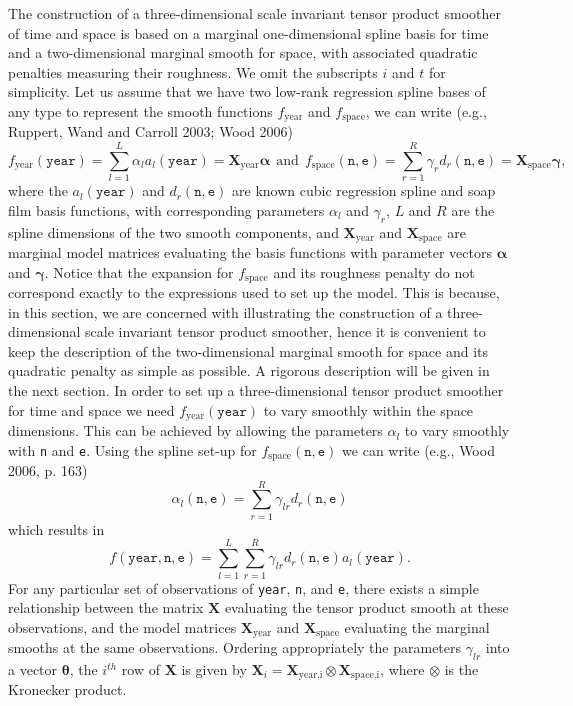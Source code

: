 \documentclass[10pt] {article}
\theoremstyle{definition}
\theoremstyle{plain}
\begin{document}
The construction of a three-dimensional scale invariant tensor product smoother of time and space is based on a marginal one-dimensional spline basis for time and a two-dimensional marginal smooth for space, with associated quadratic penalties measuring their roughness. We omit the subscripts $i$ and $t$ for simplicity. Let us assume that we have two low-rank regression spline bases of any type to represent the smooth functions $f_\text{year}$ and $f_\text{space}$, we can write (e.g., Ruppert, Wand and Carroll 2003; Wood 2006)
$$
f_\text{year}(\texttt{year})=\sum_{l=1}^L \alpha_l a_l(\texttt{year})=\textbf{X}_\text{year}\bm\alpha \ \ \text{and} \ \ f_\text{space}(\texttt{n},\texttt{e})=\sum_{r=1}^R \gamma_r d_r(\texttt{n},\texttt{e})=\textbf{X}_\text{space}\bm\gamma,
$$
where the $a_l(\texttt{year})$ and $d_r(\texttt{n},\texttt{e})$ are known cubic regression spline and soap film basis functions, with corresponding parameters $\alpha_l$ and $\gamma_r$, $L$ and $R$ are the spline dimensions of the two smooth components, and $\textbf{X}_\text{year}$ and $\textbf{X}_\text{space}$ are marginal model matrices evaluating the basis functions with parameter vectors $\bm\alpha$ and $\bm\gamma$. Notice that the expansion for $f_\text{space}$ and its roughness penalty do not correspond exactly to the expressions used to set up the model. This is because, in this section, we are concerned with illustrating the construction of a three-dimensional scale invariant tensor product smoother, hence it is convenient to keep the description of the two-dimensional marginal smooth for space and its quadratic penalty as simple as possible. A rigorous description will be given in the next section. In order to set up a three-dimensional tensor product smoother for time and space we need $f_\text{year}(\texttt{year})$ to vary smoothly within the space dimensions. This can be achieved by allowing the parameters $\alpha_l$ to vary smoothly with \texttt{n} and \texttt{e}. Using the spline set-up for $f_\text{space}(\texttt{n},\texttt{e})$ we can write (e.g., Wood 2006, p. 163)
$$
\alpha_l(\texttt{n},\texttt{e})=\sum_{r=1}^R \gamma_{lr} d_r(\texttt{n},\texttt{e})
$$    
which results in
$$
f(\texttt{year},\texttt{n},\texttt{e})=\sum_{l=1}^L \sum_{r=1}^R \gamma_{lr} d_r(\texttt{n},\texttt{e}) a_l(\texttt{year}). 
$$
For any particular set of observations of \texttt{year}, \texttt{n}, and \texttt{e}, there exists a simple relationship between the matrix $\textbf{X}$ evaluating the tensor product smooth at these observations, and the model matrices $\textbf{X}_\text{year}$ and $\textbf{X}_\text{space}$ evaluating the marginal smooths at the same observations. Ordering appropriately the parameters $\gamma_{lr}$ into a vector $\bm\theta$, the $i^{th}$ row of $\textbf{X}$ is given by $\textbf{X}_{i}=\textbf{X}_\text{year,i}\otimes\textbf{X}_\text{space,i}$, where $\otimes$ is the Kronecker product. 
\end{document}
